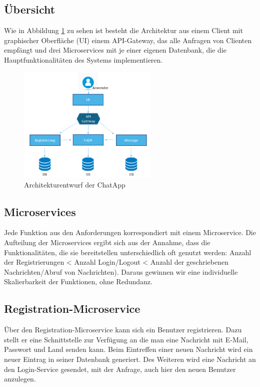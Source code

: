 \subsection{Übersicht}
Wie in Abbildung \ref{entwurf} zu sehen ist besteht die Architektur aus einem Client mit graphischer Oberfläche (UI) einem API-Gateway, das alle Anfragen von Clienten empfängt und drei Microservices mit je einer eigenen Datenbank, die die Hauptfunktionalitäten des Systems implementieren.
\begin{figure}[bth] 
	\centering
	\includegraphics[width=0.6\textwidth]{Graphics/Architekturentwurf.png}
	\caption{Architekturentwurf der ChatApp}
	\label{entwurf}
\end{figure}
\subsection{Microservices}
Jede Funktion aus den Anforderungen korrespondiert mit einem Microservice. Die Aufteilung der Microservices ergibt sich aus der Annahme, dass die Funktionalitäten, die sie bereitstellen unterschiedlich oft genutzt werden: Anzahl der Registrierungen < Anzahl Login/Logout < Anzahl der geschriebenen Nachrichten/Abruf von Nachrichten). Daraus gewinnen wir eine individuelle Skalierbarkeit der Funktionen, ohne Redundanz.

\subsection{Registration-Microservice}
Über den Registration-Microservice kann sich ein Benutzer registrieren. Dazu stellt er eine Schnittstelle zur Verfügung an die man eine Nachricht mit E-Mail, Passwort und Land senden kann. Beim Eintreffen einer neuen Nachricht wird ein neuer Eintrag in seiner Datenbank generiert. Des Weiteren wird eine Nachricht an den Login-Service gesendet, mit der Anfrage, auch hier den neuen Benutzer anzulegen.

